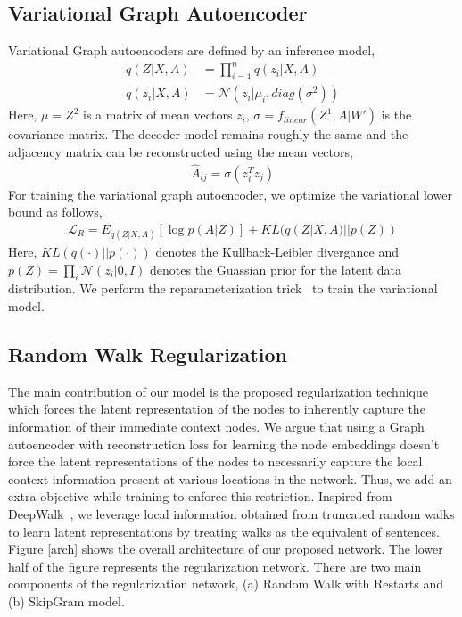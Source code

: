 \documentclass{article}
\begin{document}
\subsection{Variational Graph Autoencoder}
Variational Graph autoencoders are defined by an inference model, 
\begin{align}
    q(Z|X, A) &= \prod_{i=1}^n q(z_i|X, A)\\
    q(z_i|X, A) &= \mathcal{N}(z_i|\mu_i, diag(\sigma^2))
\end{align}
Here, $\mu = Z^2$ is a matrix of mean vectors $z_i$, $\sigma = f_{linear}(Z^1, A|W')$ is the covariance matrix. The decoder model remains roughly the same and the adjacency matrix can be reconstructed using the mean vectors, 
\begin{align}
    \hat{A}_{ij} = \sigma(z_i^Tz_j)
\end{align}
For training the variational graph autoencoder, we optimize the variational lower bound as follows, 
\begin{align}\label{lr}
    \mathcal{L}_R = E_{q(Z|X,A)}[\log p(A|Z)] + KL(q(Z|X,A) || p(Z))
\end{align}
Here, $KL(q(\cdot) || p(\cdot))$ denotes the Kullback-Leibler divergance and $p(Z) = \prod_i \mathcal{N}(z_i|0, I)$ denotes the Guassian prior for the latent data distribution. We perform the reparameterization trick~\cite{kingma2013auto} to train the variational model.

\subsection{Random Walk Regularization}
The main contribution of our model is the proposed regularization technique which forces the latent representation of the nodes to inherently capture the information of their immediate context nodes. We argue that using a Graph autoencoder with reconstruction loss for learning the node embeddings doesn't force the latent representations of the nodes to necessarily capture the local context information present at various locations in the network. Thus, we add an extra objective while training to enforce this restriction. Inspired from DeepWalk~\cite{perozzi2014deepwalk}, we leverage local information obtained from truncated random walks to learn latent representations by treating walks as the equivalent of sentences. Figure \ref{arch} shows the overall architecture of our proposed network. The lower half of the figure represents the regularization network. There are two main components of the regularization network, (a) Random Walk with Restarts and (b) SkipGram model.
\end{document}
